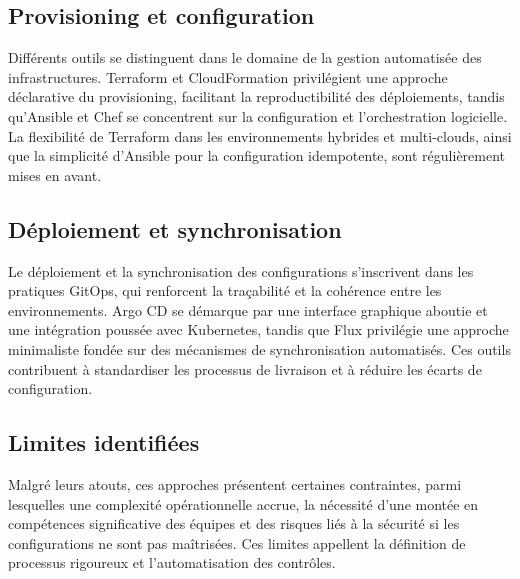 \subsection{Provisioning et configuration}

Différents outils se distinguent dans le domaine de la gestion automatisée des infrastructures. Terraform et CloudFormation privilégient une approche déclarative du provisioning, facilitant la reproductibilité des déploiements, tandis qu’Ansible et Chef se concentrent sur la configuration et l’orchestration logicielle. La flexibilité de Terraform dans les environnements hybrides et multi-clouds, ainsi que la simplicité d’Ansible pour la configuration idempotente, sont régulièrement mises en avant.

\subsection{Déploiement et synchronisation}

Le déploiement et la synchronisation des configurations s’inscrivent dans les pratiques GitOps, qui renforcent la traçabilité et la cohérence entre les environnements. Argo CD se démarque par une interface graphique aboutie et une intégration poussée avec Kubernetes, tandis que Flux privilégie une approche minimaliste fondée sur des mécanismes de synchronisation automatisés. Ces outils contribuent à standardiser les processus de livraison et à réduire les écarts de configuration.

\subsection{Limites identifiées}

Malgré leurs atouts, ces approches présentent certaines contraintes, parmi lesquelles une complexité opérationnelle accrue, la nécessité d’une montée en compétences significative des équipes et des risques liés à la sécurité si les configurations ne sont pas maîtrisées. Ces limites appellent la définition de processus rigoureux et l’automatisation des contrôles.